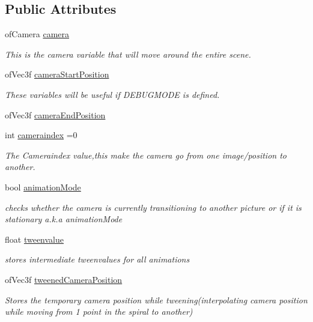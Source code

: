 \subsection*{Public Attributes}
\begin{DoxyCompactItemize}
\item 
of\-Camera \hyperlink{classtest_app_a0278ee237cbbd881252d6273b131bb55}{camera}
\begin{DoxyCompactList}\small\item\em This is the camera variable that will move around the entire scene. \end{DoxyCompactList}\item 
of\-Vec3f \hyperlink{classtest_app_ac01013264b9988207e7fd9e0a486ff2f}{camera\-Start\-Position}
\begin{DoxyCompactList}\small\item\em These variables will be useful if D\-E\-B\-U\-G\-M\-O\-D\-E is defined. \end{DoxyCompactList}\item 
of\-Vec3f \hyperlink{classtest_app_ad3319d9cd3cb00e898f4f602b879efad}{camera\-End\-Position}
\item 
int \hyperlink{classtest_app_a4ca3a51642dedbf37f2b9f6ef96510c7}{cameraindex} =0
\begin{DoxyCompactList}\small\item\em The Cameraindex value,this make the camera go from one image/position to another. \end{DoxyCompactList}\item 
bool \hyperlink{classtest_app_a2a5d49fd1f7f50f745f56095a1fa0099}{animation\-Mode}
\begin{DoxyCompactList}\small\item\em checks whether the camera is currently transitioning to another picture or if it is stationary a.\-k.\-a animation\-Mode \end{DoxyCompactList}\item 
float \hyperlink{classtest_app_add9ab1aa902948afbdf1c6db0dfde385}{tweenvalue}
\begin{DoxyCompactList}\small\item\em stores intermediate tweenvalues for all animations \end{DoxyCompactList}\item 
of\-Vec3f \hyperlink{classtest_app_ae9f60797c1c5d9f1ac06e1d6a5259957}{tweened\-Camera\-Position}
\begin{DoxyCompactList}\small\item\em Stores the temporary camera position while tweening(interpolating camera position while moving from 1 point in the spiral to another) \end{DoxyCompactList}\item 

\end{DoxyCompactItemize}
